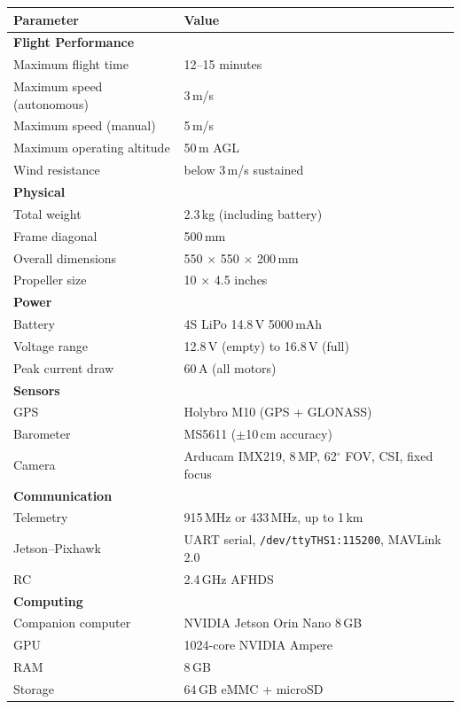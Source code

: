 \documentclass{article}
\begin{document}
\begin{tabular}{ll}
\toprule
\textbf{Parameter} & \textbf{Value} \\
\midrule
\multicolumn{2}{l}{\textbf{Flight Performance}} \\
Maximum flight time & 12--15 minutes \\
Maximum speed (autonomous) & 3\,m/s \\
Maximum speed (manual) & 5\,m/s \\
Maximum operating altitude & 50\,m AGL \\
Wind resistance & below 3\,m/s sustained \\
\midrule
\multicolumn{2}{l}{\textbf{Physical}} \\
Total weight & 2.3\,kg (including battery) \\
Frame diagonal & 500\,mm \\
Overall dimensions & 550 $\times$ 550 $\times$ 200\,mm \\
Propeller size & 10 $\times$ 4.5 inches \\
\midrule
\multicolumn{2}{l}{\textbf{Power}} \\
Battery & 4S LiPo 14.8\,V 5000\,mAh \\
Voltage range & 12.8\,V (empty) to 16.8\,V (full) \\
Peak current draw & 60\,A (all motors) \\
\midrule
\multicolumn{2}{l}{\textbf{Sensors}} \\
GPS & Holybro M10 (GPS + GLONASS) \\
Barometer & MS5611 ($\pm$10\,cm accuracy) \\
Camera & Arducam IMX219, 8\,MP, 62$^\circ$ FOV, CSI, fixed focus \\
\midrule
\multicolumn{2}{l}{\textbf{Communication}} \\
Telemetry & 915\,MHz or 433\,MHz, up to 1\,km \\
Jetson--Pixhawk & UART serial, \texttt{/dev/ttyTHS1:115200}, MAVLink 2.0 \\
RC & 2.4\,GHz AFHDS \\
\midrule
\multicolumn{2}{l}{\textbf{Computing}} \\
Companion computer & NVIDIA Jetson Orin Nano 8\,GB \\
GPU & 1024-core NVIDIA Ampere \\
RAM & 8\,GB \\
Storage & 64\,GB eMMC + microSD \\
\bottomrule
\end{tabular}
\end{document}
